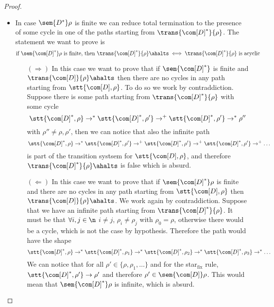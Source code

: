\begin{proof}
\begin{itemize}
  \item In case \(\sem{D^*}\rho\) is finite we can reduce total
    termination to the presence of some cycle in one of the paths
    starting from \(\trans{\com[D]^*}{\rho}\). The statement we want
    to prove is
    \begin{equation*}
      \text{if }\sem{\com[D]^*}\rho \text{ is finite, then } \trans{\com[D]^*}{\rho} \ahalts \iff \trans{\com[D]^*}{\rho} \text{ is acyclic}
    \end{equation*}
    \begin{itemize}
    \item[\((\Rightarrow)\)] In this case we want to prove that if
      \(\sem{\com[D]^*}\) is finite and
      \(\trans{\com[D]}{\rho} \ahalts\) then there are no cycles in
      any path starting from \(\stt{\com[D], \rho}\). To do so we work
      by contraddiction. Suppose there is some path starting from
      \(\trans{\com[D]^*}{\rho}\) with some cycle
      \begin{equation*}
        \stt{\com[D]^*, \rho} \to^* \stt{\com[D]^*, \rho'} \to^+ \stt{\com[D]^*, \rho'} \to^* \rho''
      \end{equation*}
      with \(\rho''\neq \rho, \rho'\), then we can notice that also
      the infinite path
      \begin{equation*}
        \stt{\com[D]^*, \rho} \to^* \stt{\com[D]^*, \rho'} \to^+ \stt{\com[D]^*, \rho'} \to^+ \stt{\com[D]^*, \rho'} \to^+ \dots
      \end{equation*}
      is part of the transition systsem for \(\stt{\com[D], \rho}\),
      and therefore \(\trans{\com[D]^*}{\rho} \ahalts\) is false which
      is absurd.
    \item[\((\Leftarrow)\)] In this case we want to prove that if
      \(\sem{\com[D]^*}\rho\) is finite and there are no cycles in any
      path starting from \(\stt{\com[D], \rho}\) then
      \(\trans{\com[D]}{\rho} \ahalts\). We work again by
      contraddiction. Suppose that we have an infinite path starting
      from \(\trans{\com[D]^*}{\rho}\). It must be that
      \(\forall i,j \in \n\) \(i \neq j\), \(\rho_i \neq \rho_j\) with
      \(\rho_0 = \rho\), otherwise there would be a cycle, which is
      not the case by hypothesis. Therefore the path would have the
      shape
      \begin{equation*}
        \stt{\com[D]^*, \rho} \to^* \stt{\com[D]^*, \rho_1} \to^* \stt{\com[D]^*, \rho_2} \to^* \stt{\com[D]^*, \rho_3} \to^* \dots
      \end{equation*}
      We can notice that for all \(\rho' \in \{\rho, \rho_1, \dots\}\)
      and for the star\(_{\text{fix}}\) rule,
      \(\stt{\com[D]^*, \rho'} \to \rho'\) and therefore
      \(\rho'\in \sem{\com[D]}\rho\). This would mean that
      \(\sem{\com[D]^*}\rho\) is infinite, which is absurd.
    \end{itemize}
  \end{itemize}
\end{proof}
